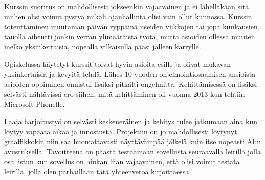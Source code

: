Kurssin suoritus on mahdollisesti jokseenkin vajaavainen ja ei lähelläkään sitä
miihen olisi voinut pystyä mikäli ajanhallinta olisi vain ollut kunnossa.
Kurssin toteuttaminen muutaman päivän ryppäinä useiden viikkojen tai jopa
kuukausien tauolla aiheutti jonkin verran ylimääräistä työtä, mutta asioiden
ollessa muuten melko yksinkertaisia, nopealla vilkaisulla pääsi jälleen
kärrylle.

Opiskelussa käytetyt kurssit toivat hyvin asioita esille ja olivat mukavan
yksinkertaisia ja kevyitä tehdä. Lähes 10 vuoden ohjelmointiosaamisen ansioista
asioiden oppiminen onnistui lisäksi pitkälti ongelmitta. Kehittämisessä on
lisäksi selvästi nähtävissä ero siihen, mitä kehittäminen oli vuonna 2013 kun
tehtiin Microsoft Phonelle.

Laaja harjoitustyö on selvästi keskeneräinen ja kehitys tulee jatkumaan aina
kun löytyy vapaata aikaa ja innostusta. Projektiin on jo mahdollisesti löytynyt
graaffikkokin niin saa huomattavasti näyttävämpää jälkelä kuin itse nopeasti
AI:n avustuksella. Tavoitteena on päästä testaamaan sovellusta seuraavalla
leirillä jolla osallistun kun sovellus on hiukan liian vajaavainen, että olisi
voinut testata leirillä, jolla olen parhaillaan tätä yhteenvetoa kirjoittaessa.
